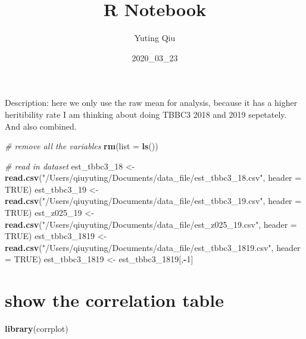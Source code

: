 \documentclass[]{article}
\title{R Notebook}
\author{Yuting Qiu}
\date{2020\_03\_23}
\newenvironment{Shaded}{\begin{snugshade}}{\end{snugshade}}
\newcommand{\CommentTok}[1]{\textcolor[rgb]{0.56,0.35,0.01}{\textit{#1}}}
\newcommand{\DataTypeTok}[1]{\textcolor[rgb]{0.13,0.29,0.53}{#1}}
\newcommand{\DecValTok}[1]{\textcolor[rgb]{0.00,0.00,0.81}{#1}}
\newcommand{\KeywordTok}[1]{\textcolor[rgb]{0.13,0.29,0.53}{\textbf{#1}}}
\newcommand{\NormalTok}[1]{#1}
\newcommand{\OperatorTok}[1]{\textcolor[rgb]{0.81,0.36,0.00}{\textbf{#1}}}
\newcommand{\OtherTok}[1]{\textcolor[rgb]{0.56,0.35,0.01}{#1}}
\newcommand{\StringTok}[1]{\textcolor[rgb]{0.31,0.60,0.02}{#1}}
\begin{document}
\maketitle

Description: here we only use the raw mean for analysis, because it has
a higher heritibility rate I am thinking about doing TBBC3 2018 and 2019
sepetately. And also combined.

\begin{Shaded}
\begin{Highlighting}[]
\CommentTok{# remove all the variables}
\KeywordTok{rm}\NormalTok{(}\DataTypeTok{list =} \KeywordTok{ls}\NormalTok{())}
\end{Highlighting}
\end{Shaded}

\begin{Shaded}
\begin{Highlighting}[]
\CommentTok{# read in dataset}
\NormalTok{est_tbbc3_}\DecValTok{18}\NormalTok{ <-}\StringTok{ }\KeywordTok{read.csv}\NormalTok{(}\StringTok{"/Users/qiuyuting/Documents/data_file/est_tbbc3_18.csv"}\NormalTok{, }\DataTypeTok{header =} \OtherTok{TRUE}\NormalTok{)}
\NormalTok{est_tbbc3_}\DecValTok{19}\NormalTok{ <-}\StringTok{ }\KeywordTok{read.csv}\NormalTok{(}\StringTok{"/Users/qiuyuting/Documents/data_file/est_tbbc3_19.csv"}\NormalTok{, }\DataTypeTok{header =} \OtherTok{TRUE}\NormalTok{)}
\NormalTok{est_z025_}\DecValTok{19}\NormalTok{ <-}\StringTok{ }\KeywordTok{read.csv}\NormalTok{(}\StringTok{"/Users/qiuyuting/Documents/data_file/est_z025_19.csv"}\NormalTok{, }\DataTypeTok{header =} \OtherTok{TRUE}\NormalTok{)}
\NormalTok{est_tbbc3_}\DecValTok{1819}\NormalTok{ <-}\StringTok{ }\KeywordTok{read.csv}\NormalTok{(}\StringTok{"/Users/qiuyuting/Documents/data_file/est_tbbc3_1819.csv"}\NormalTok{, }\DataTypeTok{header =} \OtherTok{TRUE}\NormalTok{)}
\NormalTok{est_tbbc3_}\DecValTok{1819}\NormalTok{ <-}\StringTok{ }\NormalTok{est_tbbc3_}\DecValTok{1819}\NormalTok{[,}\OperatorTok{-}\DecValTok{1}\NormalTok{]}
\end{Highlighting}
\end{Shaded}

\hypertarget{show-the-correlation-table}{%
\section{show the correlation table}\label{show-the-correlation-table}}

\begin{Shaded}
\begin{Highlighting}[]
\KeywordTok{library}\NormalTok{(corrplot)}
\end{Highlighting}
\end{Shaded}
\end{document}
